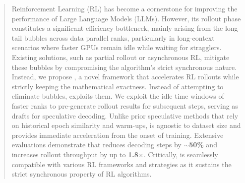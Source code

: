 \begin{abstract}
Reinforcement Learning (RL) has become a cornerstone for improving the performance of Large Language Models (LLMs). However, its rollout phase constitutes a significant efficiency bottleneck, mainly arising from the long-tail bubbles across data parallel ranks, particularly in long-context scenarios where faster GPUs remain idle while waiting for stragglers. 
Existing solutions, such as partial rollout or asynchronous RL, mitigate these bubbles by compromising the algorithm's strict synchronous nature.
Instead, we propose \textbf{\model}, a novel framework that accelerates RL rollouts while strictly keeping the mathematical exactness. 
Instead of attempting to eliminate bubbles, \model exploits them. 
We exploit the idle time windows of faster ranks to pre-generate rollout results for subsequent steps, serving as drafts for speculative decoding. 
Unlike prior speculative methods that rely on historical epoch similarity and warm-ups, \model is agnostic to dataset size and provides immediate acceleration from the onset of training. 
Extensive evaluations demonstrate that \model reduces decoding steps by \textbf{$\sim$50\%} and increases rollout throughput by up to \textbf{1.8$\times$}. Critically, \model is seamlessly compatible with various RL frameworks and strategies as it sustains the strict synchronous property of RL algorithms.
\end{abstract}

